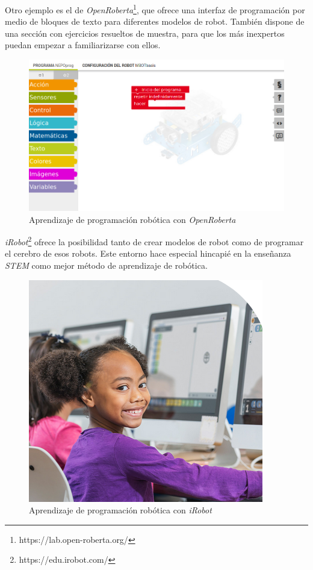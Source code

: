 \clearpage
Otro ejemplo es el de \textit{OpenRoberta}\footnote{https://lab.open-roberta.org/}, que ofrece una interfaz de programación por medio de bloques de texto para diferentes modelos de robot. También dispone de una sección con ejercicios resueltos de muestra, para que los más inexpertos puedan empezar a familiarizarse con ellos.

\begin{figure}[h!]
    \centering
    \includegraphics[scale=0.5]{openroberta.PNG}
    \caption{Aprendizaje de programación robótica con \textit{OpenRoberta}}
    \label{fig:lego}
\end{figure}

\textit{iRobot}\footnote{https://edu.irobot.com/} ofrece la posibilidad tanto de crear modelos de robot como de programar el cerebro de esos robots. Este entorno hace especial hincapié en la enseñanza \textit{STEM} como mejor método de aprendizaje de robótica.

\clearpage

\begin{figure}[h!]
    \centering
    \includegraphics[scale=0.7]{irobot.PNG}
    \caption{Aprendizaje de programación robótica con \textit{iRobot}}
    \label{fig:lego}
\end{figure}


